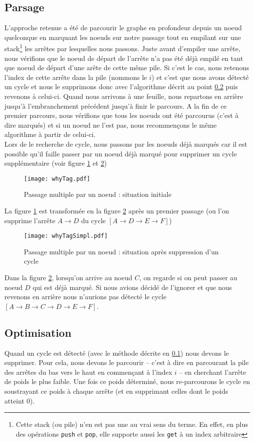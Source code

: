 \documentclass[12pt, oneside]{article}
\begin{document}
\subsection{Parsage}
\label{detect}
L'approche retenue a été de parcourir le graphe en profondeur depuis un noeud quelconque en marquant les noeuds sur notre passage tout en empilant sur une stack\footnote{Cette stack (ou pile) n'en est pas une au vrai sens du terme. En effet, en plus des opérations \texttt{push} et \texttt{pop}, elle supporte aussi les \texttt{get} à un index arbitraire} les arrêtes par lesquelles nous passons. Juste avant d'empiler une arrête, nous vérifions que le noeud de départ de l'arrête n'a pas été déjà empilé en tant que noeud de départ d'une arête de cette même pile.
Si c'est le cas, nous retenons l'index de cette arrête dans la pile (nommons le $i$) et c'est que nous avons détecté un cycle et nous le supprimons donc avec l'algorithme décrit au point \ref{del} puis revenons à celui-ci.
Quand nous arrivons à une feuille, nous repartons en arrière jusqu'à l'embranchement précédent jusqu'à finir le parcours.
A la fin de ce premier parcours, nous vérifions que tous les noeuds ont été parcourus (c'est à dire marqués) et si un noeud ne l'est pas, nous recommençons le même algorithme à partir de celui-ci.\\
Lors de le recherche de cycle, nous passons par les noeuds déjà marqués car il est possible qu'il faille passer par un noeud déjà marqué pour supprimer un cycle supplémentaire (voir figure \ref{whyTag} et \ref{whyTagSimpl})
\begin{figure}[h]
\caption{\label{whyTag} Passage multiple par un noeud : situation initiale}
\center
\texttt{[image: whyTag.pdf]}
\end{figure}
La figure \ref{whyTag} est transformée en la figure \ref{whyTagSimpl} après un premier passage
(ou l'on supprime l'arrête $A \rightarrow D$ du cycle $[A \rightarrow D \rightarrow E \rightarrow F]$)
\begin{figure}[h]
\caption{\label{whyTagSimpl} Passage multiple par un noeud : situation après suppression d'un cycle}
\center
\texttt{[image: whyTagSimpl.pdf]}
\end{figure}
Dans la figure \ref{whyTagSimpl}, lorsqu'on arrive au noeud $C$, on regarde si on peut passer au noeud $D$ qui est déjà marqué. Si nous avions décidé de l'ignorer et que nous revenons en arrière nous n'aurions pas détecté le cycle $[A \rightarrow B \rightarrow C \rightarrow D \rightarrow E \rightarrow F]$.
\subsection{Optimisation}
\label{del}
Quand un cycle est détecté (avec le méthode décrite en \ref{detect}) nous devons le supprimer. Pour cela, nous devons le parcourir -- c'est à dire en parcourant la pile des arrêtes du bas vers le haut en commençant à l'index $i$ -- en cherchant l'arrête de poids le plus faible. Une fois ce poids déterminé, nous re-parcourons le cycle en soustrayant ce poids à chaque arrête (et en supprimant celles dont le poids atteint 0).
\end{document}
